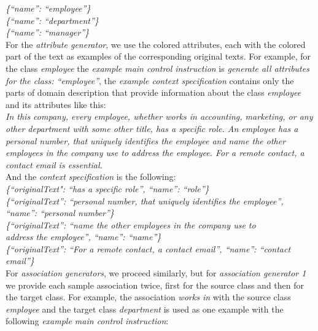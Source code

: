 \noindent{}\textit{\frenchspacing\{``name'': ``employee''\} \\
\{``name'': ``department''\} \\
\{``name'': ``manager''\}} \\

For the \emph{attribute generator}, we use the colored attributes, each with the colored part of the text as examples of the corresponding original texts. For example, for the class \textit{employee} the \emph{example main control instruction} is \textit{generate all attributes for the class: ``employee''}, the \emph{example context specification} contains only the parts of domain description that provide information about the class \textit{employee} and its attributes like this: \\

\noindent{}\textit{In this company, every employee, whether works in accounting, marketing, or any other department with some other title, has a specific role. An employee has a personal number, that uniquely identifies the employee and name the other employees in the company use to address the employee. For a remote contact, a contact email is essential.} \\

\noindent{}And the \emph{context specification} is the following: \\

\noindent{}\textit{\frenchspacing\{``originalText": ``has a specific role'', ``name'': ``role''\} \\
\{``originalText'': ``personal number, that uniquely identifies the employee'', ``name'': ``personal number''\} \\
\{``originalText'': ``name the other employees in the company use to \\ address the employee'', ``name'': ``name''\} \\
\{``originalText'': ``For a remote contact, a contact email'', ``name'': ``contact email''\}} \\


For \emph{association generators}, we proceed similarly, but for \emph{association generator 1} we provide each sample association twice, first for the source class and then for the target class. For example, the association \textit{works in} with the source class \textit{employee} and the target class \textit{department} is used as one example with the following \emph{example main control instruction}: \\

